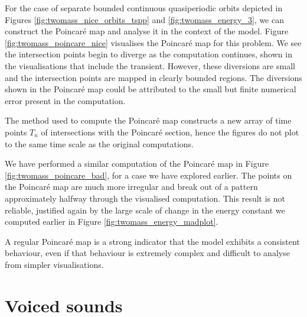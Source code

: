 For the case of separate bounded continuous quasiperiodic orbits depicted in Figures \ref{fig:twomass_nice_orbits_tspp} and \ref{fig:twomass_energy_3},
we can construct the Poincar\'e map and analyse it in the context of the model.
Figure \ref{fig:twomass_poincare_nice} visualises the Poincar\'e map for this problem.
We see the intersection points begin to diverge as the computation continues,
shown in the visualisations that include the transient.
However, these diversions are small and the intersection points are mapped in clearly bounded regions.
The diversions shown in the Poincar\'e map could be attributed to the small but finite numerical error present in the computation.

The method used to compute the Poincar\'e map \cite{manohar_2011} constructs a new array of time points $T_n$ of intersections with the Poincar\'e section,
hence the figures do not plot to the same time scale as the original computations.

We have performed a similar computation of the Poincar\'e map in Figure \ref{fig:twomass_poincare_bad},
for a case we have explored earlier.
The points on the Poincar\'e map are much more irregular and break out of a pattern approximately halfway through the visualised computation.
This result is not reliable, justified again by the large scale of change in the energy constant we computed earlier in Figure \ref{fig:twomass_energy_madplot}.

A regular Poincar\'e map is a strong indicator that the model exhibits a consistent behaviour,
even if that behaviour is extremely complex and difficult to analyse from simpler visualisations.

\section{Voiced sounds}

